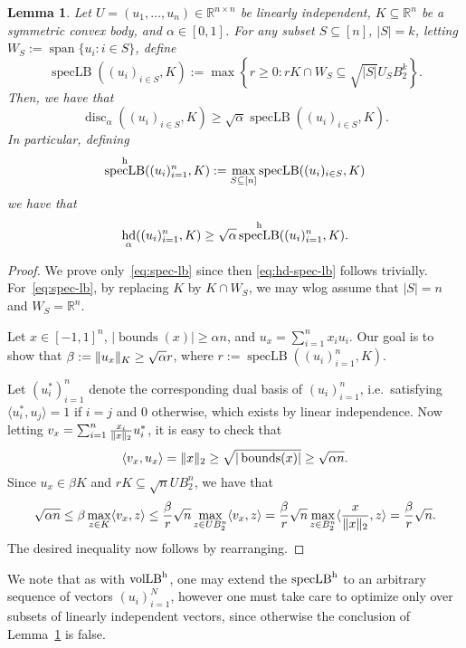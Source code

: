 \documentclass[11pt]{article}
\newtheorem{lemma}[theorem]{Lemma}
\newcommand{\R}{{\mathbb{R}}}
\newcommand{\inner}[2]{\langle #1, #2 \rangle}
\newcommand{\set}[1]{\left\{ #1 \right\}}
\DeclareMathOperator{\vollb}{volLB}
\DeclareMathOperator{\disc}{disc}
\DeclareMathOperator{\hd}{hd}
\DeclareMathOperator{\lspan}{span}
\DeclareMathOperator{\speclb}{specLB}
\DeclareMathOperator{\bnds}{bounds}
\DeclarePairedDelimiter\norm{\lVert}{\rVert}
\begin{document}
\begin{lemma}
\label{lem:speclb}
Let $U=(u_1,\dots,u_n) \in \R^{n \times n}$ be linearly independent, $K
\subseteq \R^n$ be a symmetric convex body, and $\alpha \in [0,1]$. For any
subset $S \subseteq [n]$, $|S|=k$, letting $W_S := \lspan\{u_i: i \in S\}$,
define
\[
\speclb((u_i)_{i \in S},K) := 
\max \set{r \geq 0: r K \cap W_S \subseteq \sqrt{|S|} U_S B_2^k }.
\]
Then, we have that
\begin{equation}
\label{eq:spec-lb}
\disc_\alpha((u_i)_{i \in S},K) \geq \sqrt{\alpha} \speclb((u_i)_{i \in S},K).
\end{equation}
In particular, defining
\[
\speclb^{\rm h}((u_i)_{i=1}^n,K) := \max_{S \subseteq [n]} \speclb((u_i)_{i \in
S},K)
\]
we have that
\begin{equation}
\label{eq:hd-spec-lb}
\hd_{\alpha}((u_i)_{i=1}^n,K) \geq \sqrt{\alpha} \speclb^{\rm h}((u_i)_{i=1}^n,K).
\end{equation}
\end{lemma}
\begin{proof}
We prove only~\eqref{eq:spec-lb} since then \eqref{eq:hd-spec-lb} follows
trivially. For~\eqref{eq:spec-lb}, by replacing $K$ by $K \cap W_S$, we may wlog
assume that $|S|=n$ and $W_S = \R^n$. 

Let $x \in [-1,1]^n$, $|\bnds(x)| \geq \alpha n$, and $u_x = \sum_{i=1}^n x_i
u_i$. Our goal is to show that $\beta := \norm{u_x}_K \geq \sqrt{\alpha} r$, where $r
:= \speclb((u_i)_{i=1}^n,K)$.

Let $(u_i^*)_{i=1}^n$ denote the corresponding dual basis of
$(u_i)_{i=1}^n$, i.e.~satisfying $\inner{u_i^*}{u_j} = 1$ if $i=j$ and $0$
otherwise, which exists by linear independence. Now letting $v_x =
\sum_{i=1}^n \frac{x_i}{\norm{x}_2} u_i^*$, it is easy to check that 
\[
\inner{v_x}{u_x} = \norm{x}_2 \geq \sqrt{|\bnds(x)|} \geq \sqrt{\alpha n}.
\]
Since $u_x \in \beta K$ and $r K \subseteq \sqrt{n} U B_2^n$, we have that
\begin{align*}
\sqrt{\alpha n} \leq \beta \max_{z \in K} \inner{v_x}{z} 
         \leq \frac{\beta}{r} \sqrt{n} 
               \max_{z \in UB_2^n} \inner{v_x}{z}
          = \frac{\beta}{r} \sqrt{n} \max_{z \in B_2^n}
\inner{\frac{x}{\norm{x}_2}}{z}
 = \frac{\beta}{r} \sqrt{n} .
\end{align*}
The desired inequality now follows by rearranging.
\end{proof}

We note that as with $\vollb^{\rm h}$, one may extend the $\speclb^{\rm h}$ to
an arbitrary sequence of vectors $(u_i)_{i=1}^N$, however one must take care to
optimize only over subsets of linearly independent vectors, since otherwise the
conclusion of Lemma~\ref{lem:speclb} is false.
\end{document}
